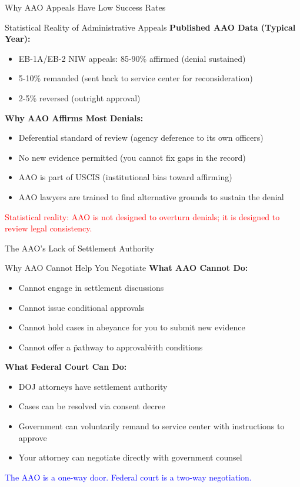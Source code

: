 \documentclass[11pt]{beamer}
\begin{document}
	
	\begin{frame}{Why AAO Appeals Have Low Success Rates}
		\scriptsize
		\begin{block}{Statistical Reality of Administrative Appeals}
			\textbf{Published AAO Data (Typical Year):}
			\begin{itemize}
				\item EB-1A/EB-2 NIW appeals: 85-90\% affirmed (denial sustained)
				\item 5-10\% remanded (sent back to service center for reconsideration)
				\item 2-5\% reversed (outright approval)
			\end{itemize}
			\textbf{Why AAO Affirms Most Denials:}
			\begin{itemize}
				\item Deferential standard of review (agency deference to its own officers)
				\item No new evidence permitted (you cannot fix gaps in the record)
				\item AAO is part of USCIS (institutional bias toward affirming)
				\item AAO lawyers are trained to find alternative grounds to sustain the denial
			\end{itemize}
			\textcolor{red}{Statistical reality: AAO is not designed to overturn denials; it is designed to review legal consistency.}
		\end{block}
	\end{frame}
	
	\begin{frame}{The AAO's Lack of Settlement Authority}
		\scriptsize
		\begin{block}{Why AAO Cannot Help You Negotiate}
			\textbf{What AAO Cannot Do:}
			\begin{itemize}
				\item Cannot engage in settlement discussions
				\item Cannot issue conditional approvals
				\item Cannot hold cases in abeyance for you to submit new evidence
				\item Cannot offer a \"pathway to approval\" with conditions
			\end{itemize}
			\textbf{What Federal Court Can Do:}
			\begin{itemize}
				\item DOJ attorneys have settlement authority
				\item Cases can be resolved via consent decree
				\item Government can voluntarily remand to service center with instructions to approve
				\item Your attorney can negotiate directly with government counsel
			\end{itemize}
			\textcolor{blue}{The AAO is a one-way door. Federal court is a two-way negotiation.}
		\end{block}
	\end{frame}
	
\end{document}
